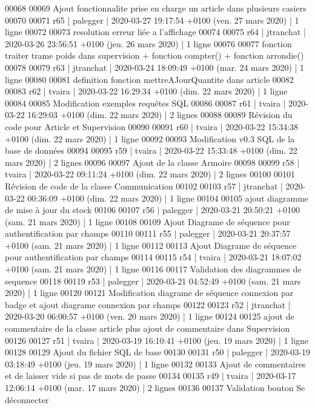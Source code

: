 \begin{DoxyCode}
00068 
00069 Ajout fonctionnalite prise en charge un article dans plusieurs casiers
00070 
00071 r65 | palegger | 2020-03-27 19:17:54 +0100 (ven. 27 mars 2020) | 1 ligne
00072 
00073 resolution erreur liée a l'affichage
00074 
00075 r64 | jtranchat | 2020-03-26 23:56:51 +0100 (jeu. 26 mars 2020) | 1 ligne
00076 
00077 fonction traiter trame poids dans supervision + fonction compter() + fonction arrondie()
00078 
00079 r63 | jtranchat | 2020-03-24 18:09:49 +0100 (mar. 24 mars 2020) | 1 ligne
00080 
00081 definition fonction mettreAJourQuantite dans article
00082 
00083 r62 | tvaira | 2020-03-22 16:29:34 +0100 (dim. 22 mars 2020) | 1 ligne
00084 
00085 Modification exemples requêtes SQL
00086 
00087 r61 | tvaira | 2020-03-22 16:29:03 +0100 (dim. 22 mars 2020) | 2 lignes
00088 
00089 Révision du code pour Article et Supervision
00090 
00091 r60 | tvaira | 2020-03-22 15:34:38 +0100 (dim. 22 mars 2020) | 1 ligne
00092 
00093 Modification v0.3 SQL de la base de données
00094 
00095 r59 | tvaira | 2020-03-22 15:33:48 +0100 (dim. 22 mars 2020) | 2 lignes
00096 
00097 Ajout de la classe Armoire
00098 
00099 r58 | tvaira | 2020-03-22 09:11:24 +0100 (dim. 22 mars 2020) | 2 lignes
00100 
00101 Révision de code de la classe Communication
00102 
00103 r57 | jtranchat | 2020-03-22 00:36:09 +0100 (dim. 22 mars 2020) | 1 ligne
00104 
00105 ajout diagramme de mise à jour du stock
00106 
00107 r56 | palegger | 2020-03-21 20:50:21 +0100 (sam. 21 mars 2020) | 1 ligne
00108 
00109 Ajout Diagrame de séquence pour authentification par champs
00110 
00111 r55 | palegger | 2020-03-21 20:37:57 +0100 (sam. 21 mars 2020) | 1 ligne
00112 
00113 Ajout Diagrame de séquence pour authentification par champs
00114 
00115 r54 | tvaira | 2020-03-21 18:07:02 +0100 (sam. 21 mars 2020) | 1 ligne
00116 
00117 Validation des diagrammes de sequence
00118 
00119 r53 | palegger | 2020-03-21 04:52:49 +0100 (sam. 21 mars 2020) | 1 ligne
00120 
00121 Modification diagrame de séquence connexion par badge et ajout diagrame connexion par champs
00122 
00123 r52 | jtranchat | 2020-03-20 06:00:57 +0100 (ven. 20 mars 2020) | 1 ligne
00124 
00125 ajout de commentaire de la classe article plus ajout de commentaire dans Supervision
00126 
00127 r51 | tvaira | 2020-03-19 16:10:41 +0100 (jeu. 19 mars 2020) | 1 ligne
00128 
00129 Ajout du fichier SQL de base
00130 
00131 r50 | palegger | 2020-03-19 03:18:49 +0100 (jeu. 19 mars 2020) | 1 ligne
00132 
00133 Ajout de commentaires et de laisser vide si pas de mots de passe
00134 
00135 r49 | tvaira | 2020-03-17 12:06:14 +0100 (mar. 17 mars 2020) | 2 lignes
00136 
00137 Validation bouton Se déconnecter

\end{DoxyCode}
